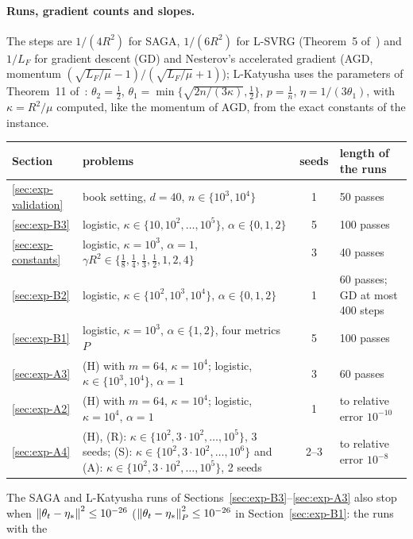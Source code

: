 \paragraph{Runs, gradient counts and slopes.}
The steps are $1/(4R^2)$ for SAGA, $1/(6R^2)$ for L-SVRG (Theorem~5 of~\cite{kovalev2020dont}) and $1/L_F$ for gradient
descent (GD) and Nesterov's accelerated gradient (AGD, momentum $(\sqrt{L_F/\mu}-1)/(\sqrt{L_F/\mu}+1)$); L-Katyusha uses
the parameters of Theorem~11 of~\cite{kovalev2020dont}: $\theta_2=\frac12$, $\theta_1=\min\{\sqrt{2n/(3\kappa)},\frac12\}$,
$p=\frac1n$, $\eta=1/(3\theta_1)$, with $\kappa=R^2/\mu$ computed, like the momentum of AGD, from the exact constants of the
instance.
\begin{center}
\small
\begin{tabular}{@{}lp{8.6cm}cp{3.6cm}@{}}
\toprule
Section & problems & seeds & length of the runs \\
\midrule
\ref{sec:exp-validation} & book setting, $d=40$, $n\in\{10^3,10^4\}$ & 1 & 50 passes \\
\ref{sec:exp-B3} & logistic, $\kappa\in\{10,10^2,\dots,10^5\}$, $\alpha\in\{0,1,2\}$ & 5 & 100 passes \\
\ref{sec:exp-constants} & logistic, $\kappa=10^3$, $\alpha=1$, $\gamma R^2\in\{\frac18,\frac14,\frac13,\frac12,1,2,4\}$ & 3 & 40 passes \\
\ref{sec:exp-B2} & logistic, $\kappa\in\{10^2,10^3,10^4\}$, $\alpha\in\{0,1,2\}$ & 1 & 60 passes; GD at most 400 steps \\
\ref{sec:exp-B1} & logistic, $\kappa=10^3$, $\alpha\in\{1,2\}$, four metrics $P$ & 5 & 100 passes \\
\ref{sec:exp-A3} & (H) with $m=64$, $\kappa=10^4$; logistic, $\kappa\in\{10^3,10^4\}$, $\alpha=1$ & 3 & 60 passes \\
\ref{sec:exp-A2} & (H) with $m=64$, $\kappa=10^4$; logistic, $\kappa=10^4$, $\alpha=1$ & 1 & to relative error $10^{-10}$ \\
\ref{sec:exp-A4} & (H), (R): $\kappa\in\{10^2,3\cdot10^2,\dots,10^5\}$, 3 seeds; (S): $\kappa\in\{10^2,3\cdot10^2,\dots,10^6\}$ and (A): $\kappa\in\{10^2,3\cdot10^2,\dots,10^5\}$, 2 seeds & 2--3 & to relative error $10^{-8}$ \\
\bottomrule
\end{tabular}
\end{center}
The SAGA and L-Katyusha runs of Sections~\ref{sec:exp-B3}--\ref{sec:exp-A3} also stop when
$\left\|\theta_t-\eta_\ast\right\|^2\le10^{-26}$ ($\left\|\theta_t-\eta_\ast\right\|_P^2\le10^{-26}$ in Section~\ref{sec:exp-B1}: the runs with the
